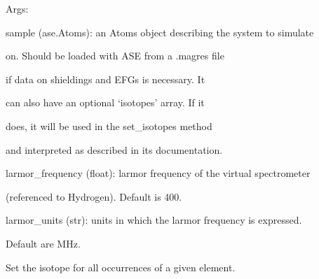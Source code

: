 \documentclass[letterpaper,10pt,english]{sphinxmanual}
\begin{document}
\begin{fulllineitems}
\begin{DUlineblock}{0em}
\item[] Args:
\item[]
\begin{DUlineblock}{\DUlineblockindent}
\item[] sample (ase.Atoms): an Atoms object describing the system to simulate
\item[]
\begin{DUlineblock}{\DUlineblockindent}
\item[] on. Should be loaded with ASE from a .magres file
\item[] if data on shieldings and EFGs is necessary. It
\item[] can also have an optional `isotopes' array. If it
\item[] does, it will be used in the set\_isotopes method
\item[] and interpreted as described in its documentation.
\end{DUlineblock}
\item[] larmor\_frequency (float): larmor frequency of the virtual spectrometer
\item[]
\begin{DUlineblock}{\DUlineblockindent}
\item[] (referenced to Hydrogen). Default is 400.
\end{DUlineblock}
\item[] larmor\_units (str): units in which the larmor frequency is expressed.
\item[]
\begin{DUlineblock}{\DUlineblockindent}
\item[] Default are MHz.
\end{DUlineblock}
\end{DUlineblock}
\end{DUlineblock}

\begin{fulllineitems}
\label{doctree/soprano.calculate.nmr.nmr:soprano.calculate.nmr.nmr.NMRCalculator.set_element_isotope}
Set the isotope for all occurrences of a given element.


\end{fulllineitems}
\end{fulllineitems}
\end{document}
